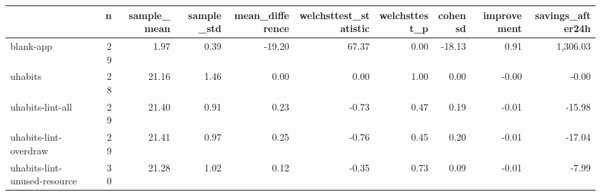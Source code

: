 \begin{tabular}{lrrrrrrrrr}
\toprule
{} &   n &  sample\_mean &  sample\_std &  mean\_difference &  welchsttest\_statistic &  welchsttest\_p &  cohensd &  improvement &  savings\_after24h \\
\midrule
blank-app                    &  29 &         1.97 &        0.39 &           -19.20 &                  67.37 &           0.00 &   -18.13 &         0.91 &          1,306.03 \\
uhabits                      &  28 &        21.16 &        1.46 &             0.00 &                   0.00 &           1.00 &     0.00 &        -0.00 &             -0.00 \\
uhabits-lint-all             &  29 &        21.40 &        0.91 &             0.23 &                  -0.73 &           0.47 &     0.19 &        -0.01 &            -15.98 \\
uhabits-lint-overdraw        &  29 &        21.41 &        0.97 &             0.25 &                  -0.76 &           0.45 &     0.20 &        -0.01 &            -17.04 \\
uhabits-lint-unused-resource &  30 &        21.28 &        1.02 &             0.12 &                  -0.35 &           0.73 &     0.09 &        -0.01 &             -7.99 \\
\bottomrule
\end{tabular}
